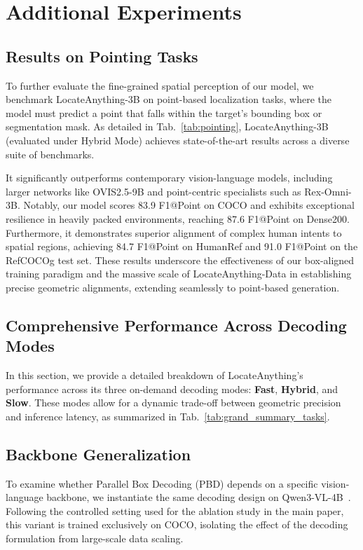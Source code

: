 \section{Additional Experiments}

\subsection{Results on Pointing Tasks}
To further evaluate the fine-grained spatial perception of our model, we benchmark LocateAnything-3B on point-based localization tasks, where the model must predict a point that falls within the target's bounding box or segmentation mask. As detailed in Tab.~\ref{tab:pointing}, LocateAnything-3B (evaluated under Hybrid Mode) achieves state-of-the-art results across a diverse suite of benchmarks. 



It significantly outperforms contemporary vision-language models, including larger networks like OVIS2.5-9B and point-centric specialists such as Rex-Omni-3B. Notably, our model scores 83.9 F1@Point on COCO and exhibits exceptional resilience in heavily packed environments, reaching 87.6 F1@Point on Dense200. Furthermore, it demonstrates superior alignment of complex human intents to spatial regions, achieving 84.7 F1@Point on HumanRef and 91.0 F1@Point on the RefCOCOg test set. These results underscore the effectiveness of our box-aligned training paradigm and the massive scale of LocateAnything-Data in establishing precise geometric alignments, extending seamlessly to point-based generation.



\subsection{Comprehensive Performance Across Decoding Modes}
In this section, we provide a detailed breakdown of LocateAnything's performance across its three on-demand decoding modes: \textbf{Fast}, \textbf{Hybrid}, and \textbf{Slow}. These modes allow for a dynamic trade-off between geometric precision and inference latency, as summarized in Tab.~\ref{tab:grand_summary_tasks}.



\subsection{Backbone Generalization}
To examine whether Parallel Box Decoding (PBD) depends on a specific vision-language backbone, we instantiate the same decoding design on Qwen3-VL-4B~\citep{bai2025qwen3vltechnicalreport}. Following the controlled setting used for the ablation study in the main paper, this variant is trained exclusively on COCO, isolating the effect of the decoding formulation from large-scale data scaling.

